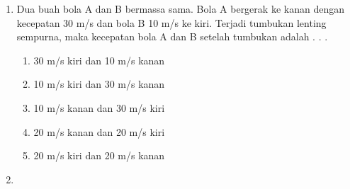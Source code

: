 \documentclass[10pt,a4paper]{extarticle}
\newcommand*\pilgan[1]{
\begin{enumerate}[label=\Alph*., itemsep=0pt,topsep=0pt,leftmargin=*,align=Center] #1 
\end{enumerate}}
\begin{document}
\begin{multicols*}{2}
\begin{enumerate}
\item Dua buah bola A dan B bermassa sama. Bola A bergerak ke kanan dengan kecepatan 30 m/s dan bola B 10 m/s ke kiri. Terjadi tumbukan lenting sempurna, maka kecepatan bola A dan B setelah tumbukan adalah . . .
\pilgan{
   \item 30 m/s kiri dan 10 m/s kanan
   \item 10 m/s kiri dan 30 m/s kanan
   \item 10 m/s kanan dan 30 m/s kiri
   \item 20 m/s kanan dan 20 m/s kiri
   \item 20 m/s kiri dan 20 m/s kanan
}
\vspace{1cm}
\item 

\end{enumerate}
\end{multicols*}
\end{document}
